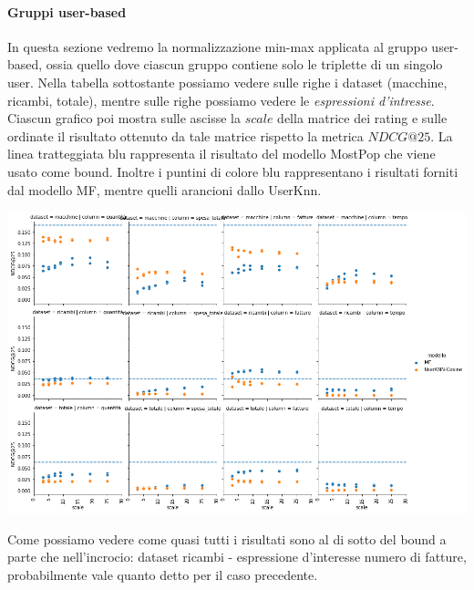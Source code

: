 \paragraph{Gruppi user-based}
In questa sezione vedremo la normalizzazione min-max applicata al gruppo user-based, ossia quello dove ciascun gruppo contiene solo le triplette di un singolo user.
Nella tabella sottostante possiamo vedere sulle righe i dataset (macchine, ricambi, totale), mentre sulle righe possiamo vedere le \textit{espressioni d'intresse}. Ciascun grafico poi mostra sulle ascisse la $scale$ della matrice dei rating e sulle ordinate il risultato ottenuto da tale matrice rispetto la metrica $NDCG@25$. La linea tratteggiata blu rappresenta il risultato del modello MostPop che viene usato come bound.
Inoltre i puntini di colore blu rappresentano i risultati forniti dal modello MF, mentre quelli arancioni dallo UserKnn.

\includegraphics[width=16cm]{figures/risultati_minmax_singolo.png}

Come possiamo vedere come quasi tutti i risultati sono al di sotto del bound a parte che nell'incrocio: dataset ricambi - espressione d'interesse numero di fatture, probabilmente vale quanto detto per il caso precedente.
\begin{minipage}[H]{0.45\textwidth}
    
\end{minipage}
\begin{minipage}[H]{0.45\textwidth}
    
\end{minipage}
